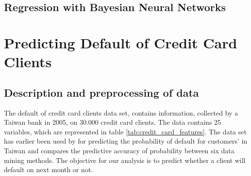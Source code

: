 \subsection{Regression with Bayesian Neural
Networks}





\begin{table}\label{tab:Boston_BNN_performance}
\caption{Performance measurement for Bayesian Neural Network models on Boston housing data}
\end{table}

\section{Predicting Default of Credit Card Clients} \label{sec:credit_default}
\subsection{Description and preprocessing of data}
The default of credit card clients data set, contains information, collected by a Taiwan bank in 2005, on $30.000$ credit card clients. The data contains 25 variables, which are represented in table \ref{tab:credit_card_features}. The data set has earlier been used by \cite{Yeh2009TheCO} for predicting the probability of default for customers' in Taiwan and compares the predictive accuracy of probability between six data mining methods. The objective for our analysis is to predict whether a client will default on next month or not. 


